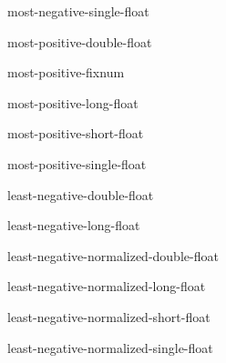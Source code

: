 \documentclass[10pt,english]{book}
\begin{document}
\begin{constant}{most-negative-single-float}{}
  
\end{constant}

\begin{constant}{most-positive-double-float}{}
  
\end{constant}

\begin{constant}{most-positive-fixnum}{}
  
\end{constant}

\begin{constant}{most-positive-long-float}{}
  
\end{constant}

\begin{constant}{most-positive-short-float}{}
  
\end{constant}

\begin{constant}{most-positive-single-float}{}
  
\end{constant}

\begin{constant}{least-negative-double-float}{}
  
\end{constant}

\begin{constant}{least-negative-long-float}{}
  
\end{constant}

\begin{constant}{least-negative-normalized-double-float}{}
  
\end{constant}

\begin{constant}{least-negative-normalized-long-float}{}
  
\end{constant}

\begin{constant}{least-negative-normalized-short-float}{}
  
\end{constant}

\begin{constant}{least-negative-normalized-single-float}{}
  
\end{constant}
\end{document}
